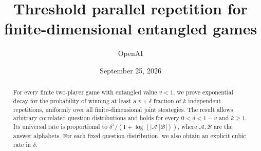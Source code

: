 \documentclass[11pt]{article}
\title{Threshold parallel repetition for finite-dimensional entangled games}
\author{OpenAI}
\date{September 25, 2026}
\theoremstyle{definition}
\theoremstyle{remark}
\begin{document}
\maketitle
\begin{abstract}
For every finite two-player game with entangled value $v<1$, we prove
exponential decay for the probability of winning at least a $v+\delta$
fraction of $k$ independent repetitions, uniformly over all
finite-dimensional joint strategies. The result allows arbitrary correlated
question distributions and holds for every $0<\delta<1-v$ and $k\ge1$.
Its universal rate is proportional to
$\delta^5/(1+\log(|\mathcal A||\mathcal B|))$, where
$\mathcal A,\mathcal B$ are the answer alphabets. For each fixed question
distribution, we also obtain an explicit cubic rate in $\delta$.
\end{abstract}
\tableofcontents
\clearpage






\clearpage


\end{document}
